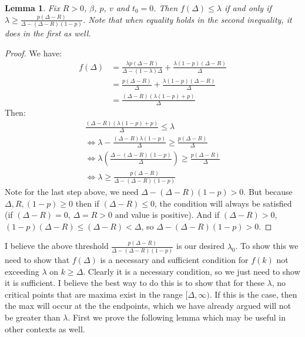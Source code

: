 \documentclass{article}
\newtheorem{lemma}{Lemma}[section]
\begin{document}
\begin{lemma} Fix $R > 0$, $\beta$, $p$, $v$ and $t_0 = 0$. Then $f(\Delta) \leq \lambda$ if and only if $\lambda \geq \frac{p(\Delta-R)}{\Delta-(\Delta-R)(1-p)}$. Note that when equality holds in the second inequality, it does in the first as well. \end{lemma}
\begin{proof}
We have:
\begin{align*}
f(\Delta) &= \frac{\lambda p (\Delta-R)}{\Delta-(1-\lambda)\Delta}+\frac{\lambda (1-p)(\Delta-R)}{\Delta} \\
&= \frac{p(\Delta-R)}{\Delta}+\frac{\lambda(1-p)(\Delta-R)}{\Delta} \\
&= \frac{(\Delta-R)(\lambda(1-p)+p)}{\Delta}
\end{align*}
Then:
\begin{gather*}
\frac{(\Delta-R)(\lambda(1-p)+p)}{\Delta} \leq \lambda \\
\iff \lambda-\frac{(\Delta-R)\lambda(1-p)}{\Delta} \geq \frac{p(\Delta-R)}{\Delta} \\
\iff \lambda \left(\frac{\Delta-(\Delta-R)(1-p)}{\Delta}\right) \geq \frac{p(\Delta-R)}{\Delta} \\
\iff \lambda \geq \frac{p(\Delta-R)}{\Delta-(\Delta-R)(1-p)}
\end{gather*}
Note for the last step above, we need $\Delta-(\Delta-R)(1-p) > 0$. But because $\Delta, R, (1-p) \geq 0$ then if $(\Delta-R) \leq 0$, the condition will always be satisfied (if $(\Delta-R) = 0$, $\Delta = R > 0$ and value is positive). And if $(\Delta-R) > 0$, $(1-p)(\Delta-R) \leq (\Delta-R) < \Delta$, so $\Delta-(\Delta-R)(1-p) > 0$.
\end{proof}

I believe the above threshold $\frac{p(\Delta-R)}{\Delta-(\Delta-R)(1-p)}$ is our desired $\lambda_0$. To show this we need to show that $f(\Delta)$ is a necessary and sufficient condition for $f(k)$ not exceeding $\lambda$ on $k \geq \Delta$. Clearly it is a necessary condition, so we just need to show it is sufficient. I believe the best way to do this is to show that for these $\lambda$, no critical points that are maxima exist in the range $[\Delta, \infty)$. If this is the case, then the max will occur at the the endpoints, which we have already argued will not be greater than $\lambda$. First we prove the following lemma which may be useful in other contexts as well. \\
\end{document}
